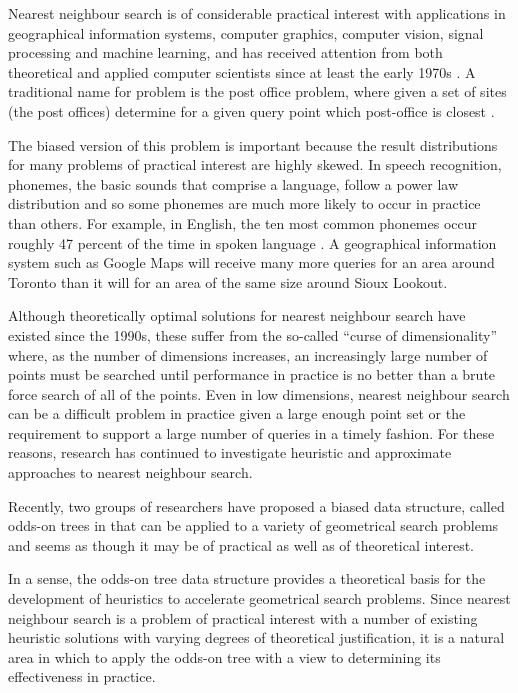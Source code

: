 \documentclass[mcs]{scsthesis}
\begin{document}
Nearest neighbour search is of considerable practical interest with
applications in geographical information systems, computer graphics,
computer vision, signal processing and machine learning, and has received
attention from both theoretical and applied computer scientists since at least
the early 1970s \cite{knuth} \cite{kdtree}. A traditional name for problem is
the post office problem, where given a set of sites (the post offices) determine
for a given query point which post-office is closest \cite{knuth}.

The biased version of this problem is important because the result distributions
for many problems of practical interest are highly skewed.  In speech
recognition, phonemes, the basic sounds that comprise a language, follow a power
law distribution \cite{yule} and so some phonemes are much more likely to occur
in practice than others. For example, in English, the ten most common phonemes
occur roughly 47 percent of the time in spoken language \cite{english-frequency}.
A geographical information system such as Google Maps will receive many more
queries for an area around Toronto than it will for an area of the same
size around Sioux Lookout.

Although theoretically optimal solutions for nearest neighbour search have
existed since the 1990s, these suffer from the so-called ``curse of
dimensionality'' where, as the number of dimensions increases, an increasingly
large number of points must be searched until performance in practice is no
better than a brute force search of all of the points. Even in low dimensions,
nearest neighbour search can be a difficult problem in practice given a large
enough point set or the requirement to support a large number of queries in a
timely fashion. For these reasons, research has continued to investigate
heuristic and approximate approaches to nearest neighbour search. 
 
Recently, two groups of researchers \cite{oddson,chan} have proposed
a biased data structure, called odds-on trees in \cite{oddson} that can be
applied to a variety of geometrical search problems and seems as though it
may be of practical as well as of theoretical interest.

In a sense, the odds-on tree data structure provides a theoretical basis for
the development of heuristics to accelerate geometrical search problems. Since
nearest neighbour search is a problem of practical interest with a number of
existing heuristic solutions with varying degrees of theoretical justification,
it is a natural area in which to apply the odds-on tree with a view to
determining its effectiveness in practice.
\end{document}
